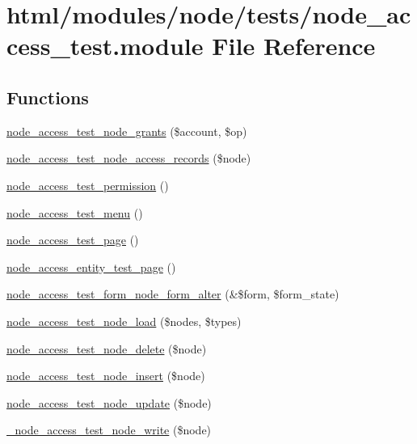 \hypertarget{node__access__test_8module}{
\section{html/modules/node/tests/node\_\-access\_\-test.module File Reference}
\label{node__access__test_8module}
}
\subsection*{Functions}
\begin{DoxyCompactItemize}
\item 
\hyperlink{node__access__test_8module_ab786cb7574630a4c4573638f07456d24}{node\_\-access\_\-test\_\-node\_\-grants} (\$account, \$op)
\item 
\hyperlink{node__access__test_8module_aaf057da77b2be1912eb8713f927533ca}{node\_\-access\_\-test\_\-node\_\-access\_\-records} (\$node)
\item 
\hyperlink{node__access__test_8module_a502abc1d3e08ab60a5643b058181f068}{node\_\-access\_\-test\_\-permission} ()
\item 
\hyperlink{node__access__test_8module_a2dd99334135c118135fc170ea07f3d46}{node\_\-access\_\-test\_\-menu} ()
\item 
\hyperlink{node__access__test_8module_a7d5ba9d1824c59f68cc2dfc2b9758487}{node\_\-access\_\-test\_\-page} ()
\item 
\hyperlink{node__access__test_8module_a303b4aa21e0a1afbca6067d38d5b961e}{node\_\-access\_\-entity\_\-test\_\-page} ()
\item 
\hyperlink{node__access__test_8module_a22d192ecfb4b1cb2fd5533e6d2330636}{node\_\-access\_\-test\_\-form\_\-node\_\-form\_\-alter} (\&\$form, \$form\_\-state)
\item 
\hyperlink{node__access__test_8module_aaeaad51d410d2cd92ff9f9d653096c8d}{node\_\-access\_\-test\_\-node\_\-load} (\$nodes, \$types)
\item 
\hyperlink{node__access__test_8module_a45b4e169741404976907c0432c119f3a}{node\_\-access\_\-test\_\-node\_\-delete} (\$node)
\item 
\hyperlink{node__access__test_8module_afb11c51940388ec9b43c605f27896573}{node\_\-access\_\-test\_\-node\_\-insert} (\$node)
\item 
\hyperlink{node__access__test_8module_a29f378c85be54f81cb706c9638a1ea07}{node\_\-access\_\-test\_\-node\_\-update} (\$node)
\item 
\hyperlink{node__access__test_8module_a64f2b481c2dd9b763d7ff9249d2ac827}{\_\-node\_\-access\_\-test\_\-node\_\-write} (\$node)
\end{DoxyCompactItemize}


